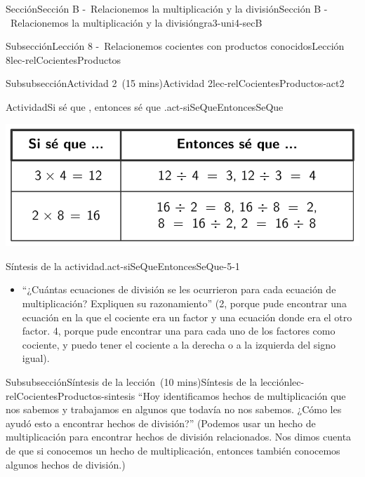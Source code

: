 \documentclass[oneside,10pt,]{article}
\begin{document}
\begin{sectionptx}{Sección}{Sección B -~Relacionemos la multiplicación y la división}{}{Sección B -~Relacionemos la multiplicación y la división}{}{}{gra3-uni4-secB}
\begin{subsectionptx}{Subsección}{Lección 8 -~Relacionemos cocientes con productos conocidos}{}{Lección 8}{}{}{lec-relCocientesProductos}
\begin{subsubsectionptx}{Subsubsección}{Actividad 2~(15 mins)}{}{Actividad 2}{}{}{lec-relCocientesProductos-act2}
\begin{activity}{Actividad}{Si sé que \textellipsis{}, entonces sé que \textellipsis{}.}{act-siSeQueEntoncesSeQue}
\begin{image}{0}{1}{0}{}
\includegraphics[width=\linewidth]{external/tikz-source/siSeQueEntoncesSeQue-tab-sol.pdf}
\end{image}%
\end{activity}%
%
\par
\begin{paragraphs}{Síntesis de la actividad.}{act-siSeQueEntoncesSeQue-5-1}%
%
\begin{itemize}[label=\textbullet]
\item{}``¿Cuántas ecuaciones de división se les ocurrieron para cada ecuación de multiplicación? Expliquen su razonamiento'' (2, porque pude encontrar una ecuación en la que el cociente era un factor y una ecuación donde era el otro factor. 4, porque pude encontrar una para cada uno de los factores como cociente, y puedo tener el cociente a la derecha o a la izquierda del signo igual).%
\end{itemize}
\end{paragraphs}%
\end{subsubsectionptx}
%
%
\typeout{************************************************}
\typeout{************************************************}
%
\begin{subsubsectionptx}{Subsubsección}{Síntesis de la lección~(10 mins)}{}{Síntesis de la lección}{}{}{lec-relCocientesProductos-sintesis}
``Hoy identificamos hechos de multiplicación que nos sabemos y trabajamos en algunos que todavía no nos sabemos. ¿Cómo les ayudó esto a encontrar hechos de división?'' (Podemos usar un hecho de multiplicación para encontrar hechos de división relacionados. Nos dimos cuenta de que si conocemos un hecho de multiplicación, entonces también conocemos algunos hechos de división.)%
\end{subsubsectionptx}
%
%
\typeout{************************************************}
\typeout{************************************************}

\end{subsectionptx}
\end{sectionptx}
\end{document}
